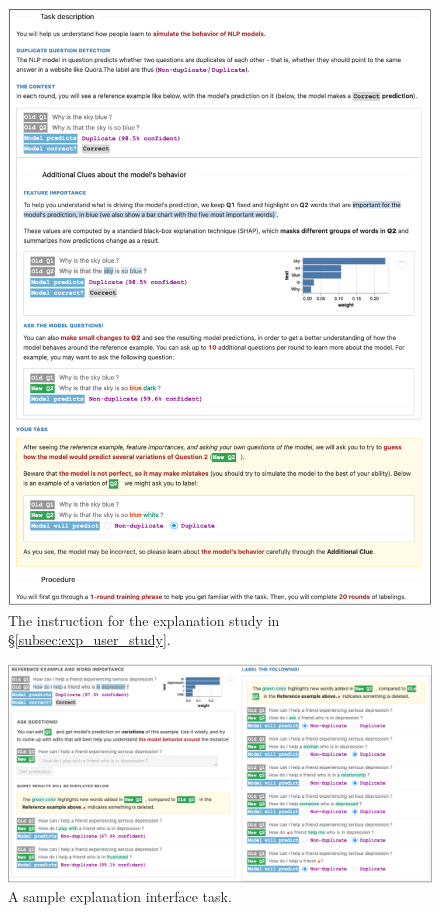 \begin{figure}
\centering
\includegraphics[width=1\textwidth]{figures/explanation_instruction}
\vspace{-15pt}
\caption{The instruction for the explanation study in \S\ref{subsec:exp_user_study}.}
\vspace{-10pt}
\label{fig:explanation_instruction}
\end{figure}


\begin{figure}
\centering
\includegraphics[width=1\textwidth]{figures/explanation_task_ui}
\vspace{-15pt}
\caption{A sample explanation interface task.}
\vspace{-10pt}
\label{fig:explanation_ui}
\end{figure}


